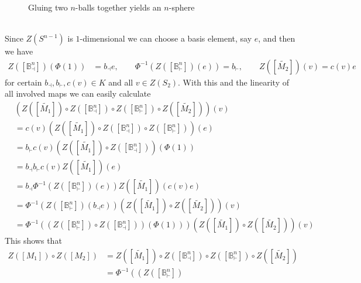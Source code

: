 \begin{prf}
\begin{figure}[h!]
\caption{Gluing two $n$-balls together yields an $n$-sphere}
\label{fig:nballs}
\end{figure}
\\
Since $Z(S^{n-1})$ is $1$-dimensional we can choose a basis element, say $e$, and then we have
\begin{align*}
  Z([\mathbb{B}_{\dashv}^{n}])(\Phi(1))
  &=
  b_{\dashv}
  e
  ,\qquad
  \Phi^{-1}
  \left(
    Z([\mathbb{B}_{\vdash}^{n}])(e)
  \right)
  =
  b_{\vdash}
  ,\qquad
  Z([\tilde{M_{2}}])(v)
  =
  c(v)
  e
\end{align*}
for certain $b_{\dashv},b_{\vdash},c(v) \in K$ and all $v \in Z(S_{2})$. With this and the linearity of all involved maps we can easily calculate
\begin{align*}
  &
  \left(
    Z([\tilde{M_{1}}])
    \circ
    Z([\mathbb{B}_{\dashv}^{n}])
    \circ
    Z([\mathbb{B}_{\vdash}^{n}])
    \circ
    Z([\tilde{M_{2}}])
  \right)
  (v)
  \\
  &=
  c(v)
  \left(
    Z([\tilde{M_{1}}])
    \circ
    Z([\mathbb{B}_{\dashv}^{n}])
    \circ
    Z([\mathbb{B}_{\vdash}^{n}])
  \right)
  (e)
  \\
  &=
  b_{\vdash}
  c(v)
  \left(
    Z([\tilde{M_{1}}])
    \circ
    Z([\mathbb{B}_{\dashv}^{n}])
  \right)
  (\Phi(1))
  \\
  &=
  b_{\dashv}
  b_{\vdash}
  c(v)
  Z([\tilde{M_{1}}])(e)
  \\
  &=
  b_{\dashv}
  \Phi^{-1}
  \left(
    Z([\mathbb{B}_{\vdash}^{n}])(e)
  \right)
  Z([\tilde{M_{1}}])(c(v)e)
  \\
  &=
  \Phi^{-1}
  \left(
    Z([\mathbb{B}_{\vdash}^{n}])(b_{\dashv}e)
  \right)
  \left(
    Z([\tilde{M_{1}}])
    \circ
    Z([\tilde{M_{2}}])
  \right)
  (v)
  \\
  &=
  \Phi^{-1}
  \left(
    \left(
      Z([\mathbb{B}_{\vdash}^{n}])
      \circ
      Z([\mathbb{B}_{\dashv}^{n}])
    \right)
    (\Phi(1))
  \right)
  \left(
    Z([\tilde{M_{1}}])
    \circ
    Z([\tilde{M_{2}}])
  \right)
  (v)
\end{align*}
This shows that
\begin{align*}
  Z([M_{1}])
  \circ
  Z([M_{2}])
  &=
  Z([\tilde{M_{1}}])
  \circ
  Z([\mathbb{B}_{\dashv}^{n}])
  \circ
  Z([\mathbb{B}_{\vdash}^{n}])
  \circ
  Z([\tilde{M_{2}}])
  \\
  &=
  \Phi^{-1}
  \left(
    \left(
      Z([\mathbb{B}_{\vdash}^{n}])

\end{align*}
\end{prf}
